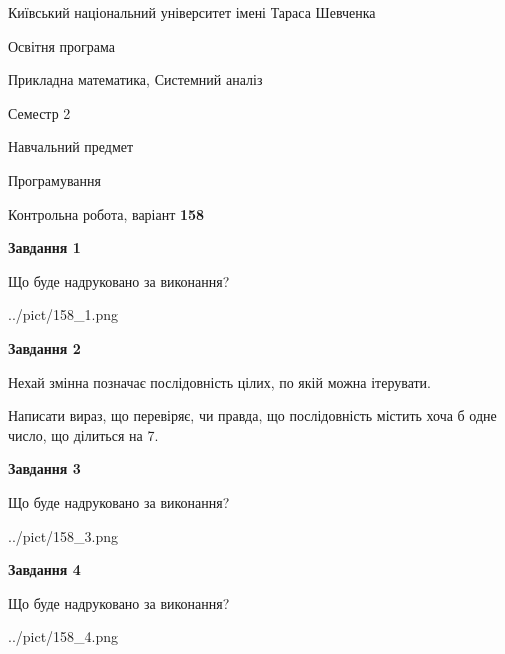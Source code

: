 \documentclass[12pt, ukrainian]{article}
\begin{document}
{{\begin {small}\par
{ \center  Київський національний університет імені Тараса Шевченка \par}
{\parbox {5 cm}{Освітня програма \hfill}{\parbox {8 cm}{Прикладна математика, Системний аналіз \hfill}}\parbox {5 cm}{\hfill Семестр 2}}\par
{\parbox {5 cm} {Навчальний предмет \hfill}\parbox {7 cm}{Програмування \hfill}\parbox {6cm}{\hfill}\par}\vspace{-7pt} \end{small}}{\center Контрольна робота, варіант  \No \textbf
{ 158 }\par}}
{
\begin {large}
{\begin {center}\textbf{Завдання 1}\end {center}}\par
Що буде надруковано за виконання?\par\par
\begin{center}
	{../pict/158_1.png}
\end{center}
\newpage

{\begin {center}\textbf{Завдання 2}\end {center}}\par
Нехай змінна  позначає послідовність цілих, по якій можна ітерувати.

Написати вираз, що перевіряє, чи правда, що послідовність  містить хоча б одне число, що ділиться на 7.\par
\newpage

{\begin {center}\textbf{Завдання 3}\end {center}}\par
Що буде надруковано за виконання?\par
\begin{center}
	{../pict/158_3.png}
\end{center}
\newpage

{\begin {center}\textbf{Завдання 4}\end {center}}\par
Що буде надруковано за виконання?\par
\begin{center}
	{../pict/158_4.png}
\end{center}
\newpage


\end{large}}
\end{document}
